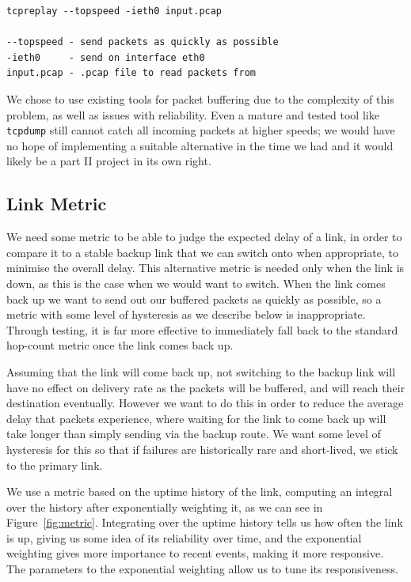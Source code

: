 \documentclass[withindex,glossary,openany]{cam-thesis}
\begin{document}
\begin{lstlisting}[label=replay_command, caption=\texttt{tcpreplay} command with explanation of arguments, frame=tb]
tcpreplay --topspeed -ieth0 input.pcap

--topspeed - send packets as quickly as possible
-ieth0     - send on interface eth0
input.pcap - .pcap file to read packets from
\end{lstlisting}

We chose to use existing tools for packet buffering due to the complexity of this problem, as well as issues with reliability. Even a mature and tested tool like \texttt{tcpdump} still cannot catch all incoming packets at higher speeds; we would have no hope of implementing a suitable alternative in the time we had and it would likely be a part II project in its own right.

\subsection{Link Metric}

We need some metric to be able to judge the expected delay of a link, in order to compare it to a stable backup link that we can switch onto when appropriate, to minimise the overall delay. This alternative metric is needed only when the link is down, as this is the case when we would want to switch. When the link comes back up we want to send out our buffered packets as quickly as possible, so a metric with some level of hysteresis as we describe below is inappropriate. Through testing, it is far more effective to immediately fall back to the standard hop-count metric once the link comes back up.

Assuming that the link will come back up, not switching to the backup link will have no effect on delivery rate as the packets will be buffered, and will reach their destination eventually. However we want to do this in order to reduce the average delay that packets experience, where waiting for the link to come back up will take longer than simply sending via the backup route. We want some level of hysteresis for this so that if failures are historically rare and short-lived, we stick to the primary link.

We use a metric based on the uptime history of the link, computing an integral over the history after exponentially weighting it, as we can see in Figure~\ref{fig:metric}. Integrating over the uptime history tells us how often the link is up, giving us some idea of its reliability over time, and the exponential weighting gives more importance to recent events, making it more responsive. The parameters to the exponential weighting allow us to tune its responsiveness.
\end{document}

